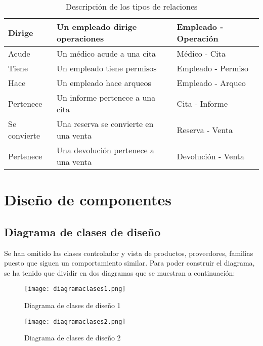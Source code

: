 \begin{table}[htb]
\begin{tabular}{|l |l| l|}
\hline
Dirige & Un empleado dirige operaciones & Empleado - Operación  \\ %
\hline
Acude & Un médico acude a una cita & Médico - Cita  \\ %
\hline
Tiene & Un empleado tiene permisos & Empleado - Permiso  \\ %
\hline
Hace & Un empleado hace arqueos & Empleado - Arqueo  \\ %
\hline
Pertenece & Un informe pertenece a una cita & Cita - Informe  \\ %
\hline
Se convierte & Una reserva se convierte en una venta & Reserva - Venta  \\ %
\hline
Pertenece & Una devolución pertenece a una venta & Devolución - Venta  \\ %
\hline
\end{tabular}
\caption{Descripción de los tipos de relaciones} %
\end{table}

\clearpage
\newpage
\section{Diseño de componentes}
\subsection{Diagrama de clases de diseño}
Se han omitido las clases controlador y vista de productos, proveedores, familias puesto que siguen un comportamiento similar.
Para poder construir el diagrama, se ha tenido que dividir en dos diagramas que se muestran a continuación:

\begin{figure}[!htb]
  \centering
    \texttt{[image: diagramaclases1.png]}
  \caption{Diagrama de clases de diseño 1}
  \label{a}
\end{figure}

\begin{figure}[!htb]
  \centering
    \texttt{[image: diagramaclases2.png]}
  \caption{Diagrama de clases de diseño 2}
  \label{a}
\end{figure}

\clearpage
